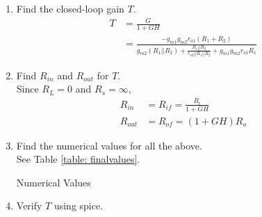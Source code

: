 \begin{enumerate}[label=\arabic*.,ref=\theenumi]
%		
%
\item Find the closed-loop gain $T$.
\\
\solution 
\begin{align}
    T &= \frac{G}{1+GH}
\\ 
 &= \frac{-g_{m1}g_{m2}r_{o1}(R_{1} + R_{2})}{g_{m2}(R_{1}||R_{2}) + \frac{R_{1}||R_{2}}{r_{o2}||R_{1}||R_{2}} +g_{m1}g_{m2}r_{o1}R_{1}}
\end{align}
\item Find $R_{in}$ and $R_{out}$ for $T$.
\\
\solution Since $R_{L} =0$ and $R_{s} =\infty$,
\begin{align}
    R_{in} &= R_{if} =\frac{R_{i}}{1+GH}
\\
    R_{out} &= R_{of} = (1+GH)R_{o}
\end{align}
\item Find the numerical values for all the above.
\\
\solution 
See Table \ref{table: finalvalues}.
\begin{table}[!ht]
\centering

\caption{Numerical Values}
\label{table: finalvalues}
\end{table}
%
\item Verify $T$ using spice.
\end{enumerate}
